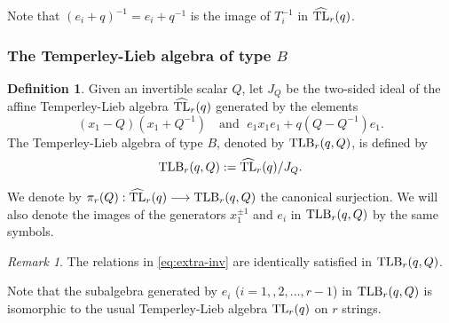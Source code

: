 \documentclass[12pt]{amsart}
\theoremstyle{definition}
\newtheorem{definition}[theorem]{Definition}
\theoremstyle{remark}
\newtheorem{remark}[theorem]{Remark}
\numberwithin{equation}{section}
\newcommand{\inv}{^{-1}}
\newcommand{\TL}{{\rm{TL}}}
\newcommand{\HTL}{\widehat{\rm TL}}
\newcommand{\TLB}{{\rm{TLB}}}
\begin{document}
Note that $(e_i+q)\inv=e_i+q\inv$ is the image of $T_i\inv$ in $\HTL_r(q)$.
%
%

%
%
\subsubsection{The Temperley-Lieb algebra of type $B$}
%
%


\begin{definition} \label{def:TLB-alg} \cite{GL03} Given an invertible scalar $Q$, let  $J_Q$ be the two-sided 
ideal of the affine Temperley-Lieb algebra $\HTL_r(q)$ generated by the elements
\[
 (x_1-Q)(x_1+Q^{-1}) \quad\text{and  }\; e_1 x_1 e_1 + q(Q-Q^{-1}) e_1.
\]
The Temperley-Lieb algebra of type $B$, denoted by $\TLB_r(q, Q)$, is defined by 
\[
\TLB_r(q, Q):=\HTL_r(q)/J_Q.
\]
\end{definition}
We denote by $\pi_r(Q): \HTL_r(q) \longrightarrow \TLB_r(q, Q)$ the canonical surjection. 
We will also denote the images of the generators $x_1^{\pm 1}$ and $e_i$ in
$\TLB_r(q, Q)$ by the same symbols.  

\begin{remark}
The relations in \eqref{eq:extra-inv} are identically satisfied in $\TLB_r(q, Q)$. 
\end{remark}

Note that the subalgebra generated by $e_i$ ($i=1, ,2, \dots, r-1$) in $\TLB_r(q, Q)$ is isomorphic to the
usual  Temperley-Lieb algebra $\TL_r(q)$ on $r$ strings. 
%
%
\end{document}
